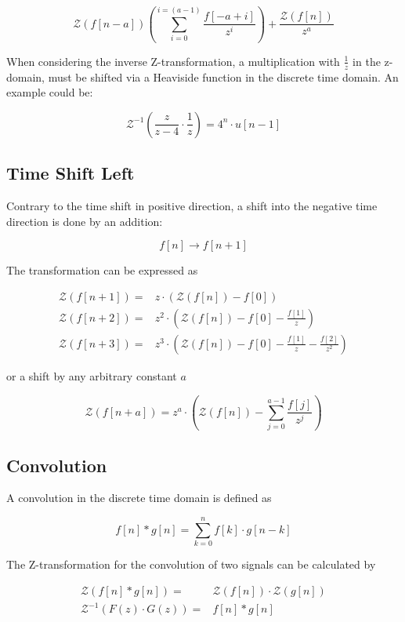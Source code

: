 \documentclass[./\jobname.tex]{subfiles}
\begin{document}
\begin{equation}
	\mathcal{Z}(f[n-a]) \left( \sum_{i=0}^{i=(a-1)} \frac{f[-a + i]}{z^i} \right) + \frac{\mathcal{Z}(f[n])}{z^a}
\end{equation}

When considering the inverse Z-transformation, a multiplication with $\frac{1}{z}$ in the z-domain, must be shifted via a Heaviside function in the discrete time domain. An example could be: 

\begin{equation}
	\mathcal{Z}^{-1} \left( \frac{z}{z-4} \cdot \frac{1}{z} \right) = 4^n \cdot u[n-1]
\end{equation}

\subsection{Time Shift Left}

Contrary to the time shift in positive direction, a shift into the negative time direction is done by an addition: 

\begin{equation}
	f[n] \rightarrow f[n + 1]
\end{equation}

The transformation can be expressed as

\begin{equation}
	\begin{split}
		\mathcal{Z}(f[n+1]) = & z \cdot (\mathcal{Z}(f[n]) - f[0]) \\
		\mathcal{Z}(f[n+2]) = & z^2 \cdot \left( \mathcal{Z}(f[n]) - f[0] - \frac{f[1]}{z} \right) \\
		\mathcal{Z}(f[n+3]) = & z^3 \cdot \left( \mathcal{Z}(f[n]) - f[0] - \frac{f[1]}{z} - \frac{f[2]}{z^2}\right)
	\end{split}
\end{equation}

or a shift by any arbitrary constant $a$

\begin{equation}
	\mathcal{Z}(f[n+a]) = z^a \cdot \left( \mathcal{Z}(f[n]) - \sum_{j=0}^{a-1} \frac{f[j]}{z^j}\right)
\end{equation}

\subsection{Convolution}

A convolution in the discrete time domain is defined as 

\begin{equation}
	f[n] * g[n] = \sum_{k=0}^{n} f[k] \cdot g[n-k]
\end{equation}

The Z-transformation for the convolution of two signals can be calculated by

\begin{equation}
	\begin{split}
		\mathcal{Z}(f[n] * g[n]) = & \mathcal{Z}(f[n]) \cdot \mathcal{Z}(g[n]) \\
		\mathcal{Z}^{-1}(F(z) \cdot G(z)) = & f[n] * g[n]
	\end{split}
\end{equation}
\end{document}
